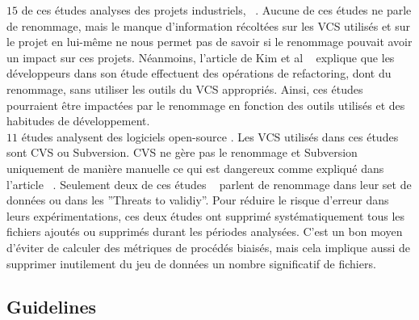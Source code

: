 $15$ de ces études analyses des projets industriels, ~\cite{arisholm_systematic_2010,graves_predicting_2000,khoshgoftaar_using_2000,layman_iterative_2008,munson_code_1998,nagappan_use_2005,nagappan_influence_2008,nagappan_using_2007,nagappan_using_2006,nagappan_change_2010,nikora_building_2006,ostrand_programmer-based_2010,weyuker_too_2008,weyuker_using_2007,yuan_application_2000}. Aucune de ces études ne parle de renommage, mais le manque d'information récoltées sur les VCS utilisés et sur le projet en lui-même ne nous permet pas de savoir si le renommage pouvait avoir un impact sur ces projets. Néanmoins, l'article de Kim et al ~\cite{kim_field_2012} explique que les développeurs dans son étude effectuent des opérations de refactoring, dont du renommage, sans utiliser les outils du VCS appropriés. Ainsi, ces études pourraient être impactées par le renommage en fonction des outils utilisés et des habitudes de développement.\\

$11$ études analysent des logiciels open-source \cite{dambros_relationship_2009,bacchelli_are_2010,caglayan_merits_2009,dambros_evaluating_2012,dambros_evaluating_2012,dambros_extensive_2010,illes-seifert_exploring_2010,li_finding_2005,matsumoto_analysis_2010,moser_analysis_2008,moser_comparative_2008,schroter_if_2006}. Les VCS utilisés dans ces études sont CVS ou Subversion. CVS ne gère pas le renommage et Subversion uniquement de manière manuelle ce qui est dangereux comme expliqué dans l'article ~\cite{lavoie_inferring_2012,steidl_incremental_2014}. Seulement deux de ces études ~\cite{moser_analysis_2008,moser_comparative_2008} parlent de renommage dans leur set de données ou dans les ''Threats to validiy''. Pour réduire le risque d'erreur dans leurs expérimentations, ces deux études ont supprimé systématiquement tous les fichiers ajoutés ou supprimés durant les périodes analysées. C'est un bon moyen d'éviter de calculer des métriques de procédés biaisés, mais cela implique aussi de supprimer inutilement du jeu de données un nombre significatif de fichiers.\\

\subsection{Guidelines}
\label{sec:guidelines}

